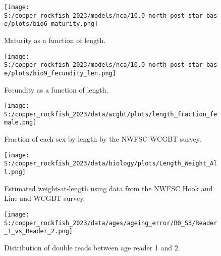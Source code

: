 \documentclass[11pt,
  letterpaper,
]{article}
\begin{document}
\pagebreak

\begin{figure}
{\centering
\texttt{[image: S:/copper\_rockfish\_2023/models/nca/10.0\_north\_post\_star\_base/plots/bio6\_maturity.png]}
}
\caption{Maturity as a function of length.\label{fig:maturity}}
\end{figure}

\pagebreak

\begin{figure}
{\centering
\texttt{[image: S:/copper\_rockfish\_2023/models/nca/10.0\_north\_post\_star\_base/plots/bio9\_fecundity\_len.png]}
}
\caption{Fecundity as a function of length.\label{fig:fecundity}}
\end{figure}

\pagebreak

\begin{figure}
{\centering
\texttt{[image: S:/copper\_rockfish\_2023/data/wcgbt/plots/length\_fraction\_female.png]}
}
\caption{Fraction of each sex by length by the NWFSC WCGBT survey.\label{fig:frac-sex-len}}
\end{figure}

\pagebreak

\begin{figure}
{\centering
\texttt{[image: S:/copper\_rockfish\_2023/data/biology/plots/Length\_Weight\_All.png]}
}
\caption{Estimated weight-at-length using data from the NWFSC Hook and Line and WCGBT survey.\label{fig:weight-length}}
\end{figure}

\pagebreak

\begin{figure}
{\centering
\texttt{[image: S:/copper\_rockfish\_2023/data/ages/ageing\_error/B0\_S3/Reader\_1\_vs\_Reader\_2.png]}
}
\caption{Distribution of double reads between age reader 1 and 2.\label{fig:age-error-dist}}
\end{figure}
\end{document}
